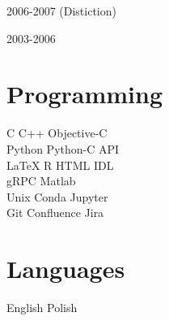 \documentclass[]{mbcv}
\begin{document}
{\begin{minipage}[t][0.85\textheight]{0.3\textwidth}
2006-2007 (Distiction)
\sectionsep

2003-2006

\vspace*{10pt}

\sectionsep
\section{Programming}
\vspace{5pt}
 C \textbullet{}  C++ \textbullet{} Objective-C  \\
Python \textbullet{} Python-C API   \\
 \LaTeX \textbullet{} R \textbullet{} HTML \textbullet{} IDL\\
 gRPC \textbullet{} Matlab\\
 
\vspace{5pt}
Unix \textbullet{} Conda \textbullet{} Jupyter  \\
Git \textbullet{} Confluence \textbullet{} Jira \\

\vspace*{10pt}
\sectionsep
\section{Languages}
English \textbullet{} Polish

\end{minipage}}%
\hfill
\end{document}
